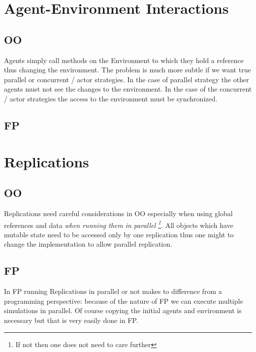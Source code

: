\section{Agent-Environment Interactions}
\subsection{OO}
Agents simply call methods on the Environment to which they hold a reference thus changing the environment. The problem is much more subtle if we want true parallel or concurrent / actor strategies. In the case of parallel strategy the other agents must not see the changes to the environment. In the case of the concurrent / actor strategies the access to the environment must be synchronized.
\subsection{FP}

\section{Replications}
\subsection{OO}
Replications need careful considerations in OO especially when using global references and data \textit{when running them in parallel \footnote{If not then one does not need to care further}}. All objects which have mutable state need to be accessed only by one replication thus one might to change the implementation to allow parallel replication.
\subsection{FP}
In FP running Replications in parallel or not makes to difference from a programming perspective: because of the nature of FP we can execute multiple simulations in parallel. Of course copying the initial agents and environment is necessary but that is very easily done in FP.